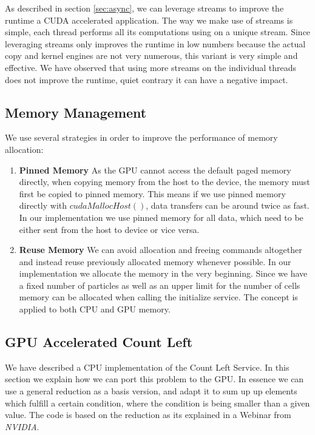 \documentclass[]{article}
\begin{document}
As described in section \ref{sec:async}, we can leverage streams to improve the runtime a CUDA accelerated application. The way we make use of streams is simple, each thread performs all its computations using on a unique stream. Since leveraging streams only improves the runtime in low numbers because the actual copy and kernel engines are not very numerous, this variant is very simple and effective. We have observed that using more streams on the individual threads does not improve the runtime, quiet contrary it can have a negative impact. 


\subsection{Memory Management}

We use several strategies in order to improve the performance of memory allocation: 

\begin{enumerate}
	\item \textbf{Pinned Memory} As the GPU cannot access the default paged memory directly, when copying memory from the host to the device, the memory must first be copied to pinned memory. This means if we use pinned memory directly with $cudaMallocHost()$, data transfers can be around twice as fast. In our implementation we use pinned memory for all data, which need to be either sent from the host to device or vice versa.
	\item \textbf{Reuse Memory} We can avoid allocation and freeing commands altogether and instead reuse previously allocated memory whenever possible. In our implementation we allocate the memory in the very beginning. Since we have a fixed number of particles as well as an upper limit for the number of cells memory can be allocated when calling the initialize service. The concept is applied to both CPU and GPU memory.
\end{enumerate}

\subsection{GPU Accelerated Count Left}


We have described a CPU implementation of the Count Left Service. In this section we explain how we can port this problem to the GPU. In essence we can use a general reduction as a basis version, and adapt it to sum up up elements which fulfill a certain condition, where the condition is being smaller than a given value. The code is based on the reduction as its explained in a Webinar from \textit{NVIDIA}. \cite{reduction}
\end{document}
